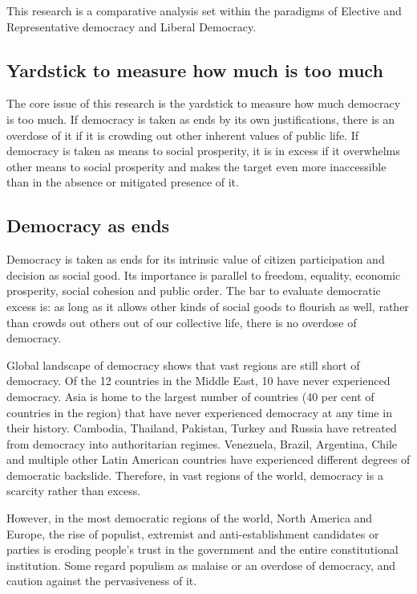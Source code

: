 \documentclass{scrartcl}
\begin{document}
This research is a comparative analysis set within the paradigms of
Elective and Representative democracy and Liberal Democracy. 

\subsection*{Yardstick to measure how much is too much}

The core issue of this research is the yardstick to measure how much
democracy is too much. If democracy is taken as ends by its
own justifications, there is an overdose of it if it is crowding out
other inherent values of public life. If democracy is taken
as means to social prosperity, it is in excess if it overwhelms other
means to social prosperity and makes the target even more inaccessible
than in the absence or mitigated presence of it. 

\subsection*{Democracy as ends}

Democracy is taken as ends for its intrinsic value of citizen participation
and decision as social good. Its importance is parallel to freedom,
equality, economic prosperity, social cohesion and public order. The
bar to evaluate democratic excess is: as long as it allows other kinds
of social goods to flourish as well, rather than crowds out others
out of our collective life, there is no overdose of democracy. 

Global landscape of democracy shows that vast regions are still short
of democracy. Of the 12 countries in the Middle East, 10 have never
experienced democracy. Asia is home to the largest number of countries
(40 per cent of countries in the region) that have never experienced
democracy at any time in their history. 
Cambodia,
Thailand,
Pakistan,
Turkey and Russia have retreated from democracy into authoritarian regimes.
Venezuela, Brazil, Argentina,
Chile and multiple other Latin American countries have experienced
different degrees of democratic backslide\autocite{IDEA}. Therefore, in vast
regions of the world, democracy is a scarcity rather than excess. 

However, in the most democratic regions of the world, North America
and Europe, the rise of populist, extremist and anti-establishment
candidates or parties is eroding people's trust in the government
and the entire constitutional institution. Some regard populism as
malaise or an overdose of democracy, and caution against the pervasiveness
of it.
\end{document}
